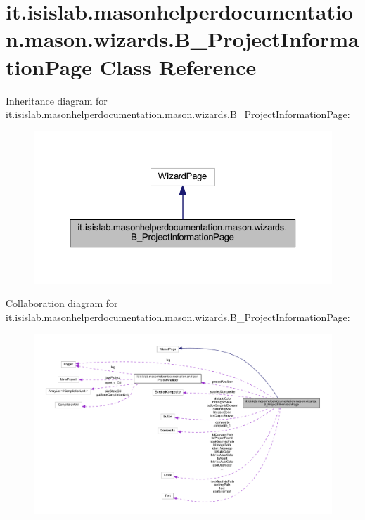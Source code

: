 \hypertarget{classit_1_1isislab_1_1masonhelperdocumentation_1_1mason_1_1wizards_1_1_b___project_information_page}{\section{it.\-isislab.\-masonhelperdocumentation.\-mason.\-wizards.\-B\-\_\-\-Project\-Information\-Page Class Reference}
\label{classit_1_1isislab_1_1masonhelperdocumentation_1_1mason_1_1wizards_1_1_b___project_information_page}
}


Inheritance diagram for it.\-isislab.\-masonhelperdocumentation.\-mason.\-wizards.\-B\-\_\-\-Project\-Information\-Page\-:\nopagebreak
\begin{figure}[H]
\begin{center}
\leavevmode
\includegraphics[width=326pt]{classit_1_1isislab_1_1masonhelperdocumentation_1_1mason_1_1wizards_1_1_b___project_information_page__inherit__graph}
\end{center}
\end{figure}


Collaboration diagram for it.\-isislab.\-masonhelperdocumentation.\-mason.\-wizards.\-B\-\_\-\-Project\-Information\-Page\-:\nopagebreak
\begin{figure}[H]
\begin{center}
\leavevmode
\includegraphics[width=350pt]{classit_1_1isislab_1_1masonhelperdocumentation_1_1mason_1_1wizards_1_1_b___project_information_page__coll__graph}
\end{center}
\end{figure}
